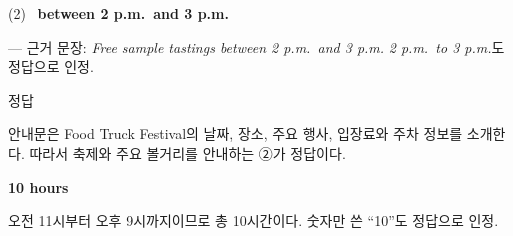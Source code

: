 \documentclass[11pt,a4paper]{article}
\newcommand{\sol}[2]{\vspace{6pt}{\sffamily\bfseries #1} \quad 정답 \fbox{#2}\par\vspace{1pt}}
\begin{document}
\vspace{6pt}
(2)  \ \textbf{between 2 p.m.\ and 3 p.m.}\par
\vspace{1pt}\hspace{1.5em}— 근거 문장: \textit{Free sample tastings between 2 p.m.\ and 3 p.m.} \quad \textit{2 p.m.\ to 3 p.m.}도 정답으로 인정.

\vspace{8pt}
\sol{3. 글의 목적}{②}
안내문은 Food Truck Festival의 날짜, 장소, 주요 행사, 입장료와 주차 정보를 소개한다. 따라서 축제와 주요 볼거리를 안내하는 ②가 정답이다.

\vspace{6pt}{\sffamily\bfseries 4. 서술형}\par
{} \quad \textbf{10 hours}\par
오전 11시부터 오후 9시까지이므로 총 10시간이다. 숫자만 쓴 ``10''도 정답으로 인정.
\end{document}
